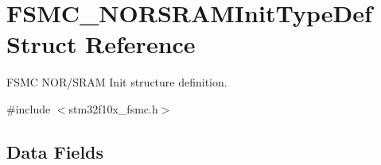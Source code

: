 \hypertarget{struct_f_s_m_c___n_o_r_s_r_a_m_init_type_def}{\section{F\-S\-M\-C\-\_\-\-N\-O\-R\-S\-R\-A\-M\-Init\-Type\-Def Struct Reference}
\label{struct_f_s_m_c___n_o_r_s_r_a_m_init_type_def}
}


F\-S\-M\-C N\-O\-R/\-S\-R\-A\-M Init structure definition.  




{\ttfamily \#include $<$stm32f10x\-\_\-fsmc.\-h$>$}

\subsection*{Data Fields}
